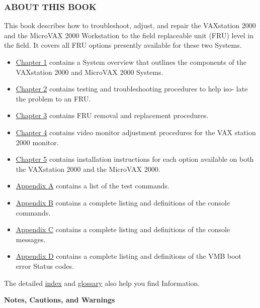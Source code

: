 \maketitle
\toc

\newpage
\pagestyle{preface}


\subsubsection*{ABOUT THIS BOOK}

This book describes how to troubleshoot, adjust, and repair the VAXstation
2000 and the MicroVAX 2000 Workstation to the field replaceable unit (FRU)
level in the field. It covers all FRU options presently available for these two
Systems.

\begin{itemize}
\item \hyperlink{chapter.1}{Chapter 1} contains a System overview that outlines the components of the VAXstation 2000 and MicroVAX 2000 Systems.

\item \hyperlink{chapter.2}{Chapter 2} contains testing and troubleshooting procedures to help iso-
late the problem to an FRU.
\item \hyperlink{chapter.3}{Chapter 3} contains FRU removal and replacement procedures.
\item \hyperlink{chapter.4}{Chapter 4} contains video monitor adjustment procedures for the VAX station 2000 monitor.
\item \hyperlink{chapter.5}{Chapter 5} contains installation instructions for each option available on both the VAXstation 2000 and the MicroVAX 2000.
\item \hyperlink{appendix.a}{Appendix A} contains a list of the test commands.
\item \hyperlink{appendix.b}{Appendix B} contains a complete listing and definitions of the console commands.
\item \hyperlink{appendix.c}{Appendix C} contains a complete listing and definitions of the console messages.
\item \hyperlink{appendix.d}{Appendix D} contains a complete listing and definitions of the VMB boot error Status codes.

\end{itemize}

The detailed \hyperlink{sec:index}{index} and \hyperlink{sec:glossary}{glossary} also help you find Information.

\textbf{Notes, Cautions, and Warnings}

